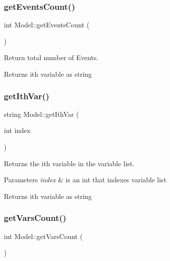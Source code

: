 \subsubsection{\texorpdfstring{get\+Events\+Count()}{getEventsCount()}}
{\footnotesize\ttfamily int Model\+::get\+Events\+Count (\begin{DoxyParamCaption}{ }\end{DoxyParamCaption})}



Return total number of Events. 

\begin{DoxyReturn}{Returns}
ith variable as string 
\end{DoxyReturn}
\mbox{\label{class_model_adcb9dcc2d1d58f18d595f1476fc77b3b}} 
\subsubsection{\texorpdfstring{get\+Ith\+Var()}{getIthVar()}}
{\footnotesize\ttfamily string Model\+::get\+Ith\+Var (\begin{DoxyParamCaption}\item[{int}]{index }\end{DoxyParamCaption})}



Returns the ith variable in the variable list. 


\begin{DoxyParams}{Parameters}
{\em index} & is an int that indexes variable list \\
\hline
\end{DoxyParams}
\begin{DoxyReturn}{Returns}
ith variable as string 
\end{DoxyReturn}
\mbox{\label{class_model_ae8b56a284c355ff18421174d078dc870}} 
\subsubsection{\texorpdfstring{get\+Vars\+Count()}{getVarsCount()}}
{\footnotesize\ttfamily int Model\+::get\+Vars\+Count (\begin{DoxyParamCaption}{ }\end{DoxyParamCaption})}



